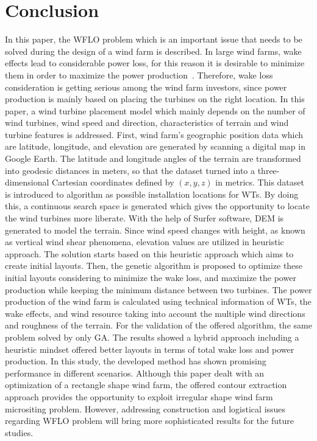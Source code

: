 \documentclass[]{iptconf}
\begin{document}
\section{Conclusion} \label{sec:conclusion}
In this paper, the WFLO problem which is an important issue that needs to be solved
during the design of a wind farm is described. In large wind farms, wake effects
lead to considerable power loss, for this reason it is desirable to minimize them in
order to maximize the power production~\cite{Samorani2011}. Therefore, wake loss consideration
is getting serious among the wind farm investors, since power production is mainly
based on placing the turbines on the right location. In this paper, a wind turbine
placement model which mainly depends on the number of wind turbines, wind speed
and direction, characteristics of terrain and wind turbine features is addressed. First,
wind farm's geographic position data which are latitude, longitude, and elevation
are generated by scanning a digital map in Google Earth. The latitude and longitude
angles of the terrain are transformed into geodesic distances in meters, so that the
dataset turned into a three-dimensional Cartesian coordinates defined by $(x, y, z)$
in metrics. This dataset is introduced to algorithm as possible installation locations
for WTs. By doing this, a continuous search space is generated which gives the
opportunity to locate the wind turbines more liberate. With the help of Surfer
software, DEM is generated to model the terrain. Since wind speed changes with
height, as known as vertical wind shear phenomena, elevation values are utilized
in heuristic approach. The solution starts based on this heuristic approach which
aims to create initial layouts. Then, the genetic algorithm is proposed to optimize
these initial layouts considering to minimize the wake loss, and maximize the power
production while keeping the minimum distance between two turbines. The power
production of the wind farm is calculated using technical information of WTs, the
wake effects, and wind resource taking into account the multiple wind directions
and roughness of the terrain. For the validation of the offered algorithm, the same
problem solved by only GA. The results showed a hybrid approach including a
heuristic mindset offered better layouts in terms of total wake loss and power
production.
In this study, the developed method has shown promising performance in
different scenarios. Although this paper dealt with an optimization of a rectangle
shape wind farm, the offered contour extraction approach provides the opportunity
to exploit irregular shape wind farm micrositing problem. However, addressing
construction and logistical issues regarding WFLO problem will bring more
sophisticated results for the future studies.
\end{document}
